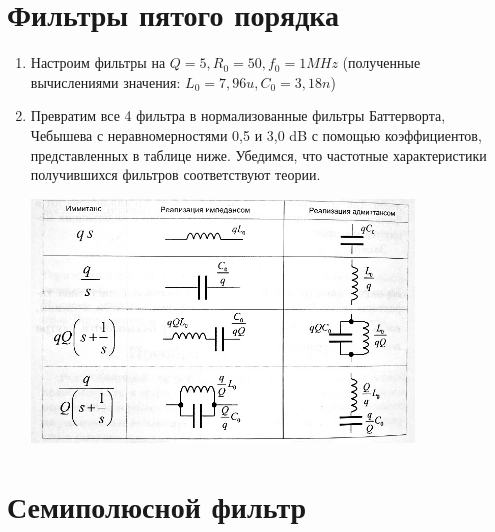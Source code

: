 \documentclass[a4paper, 12pt]{article}%
\begin{document}
\section{Фильтры пятого порядка}

\begin{enumerate}

\item Настроим фильтры на $Q = 5, R_0 = 50, f_0 = 1MHz$ (полученные вычислениями значения: $L_0= 7,96u, C_0 = 3,18n$)

\item Превратим все 4 фильтра в нормализованные фильтры Баттерворта, Чебышева с неравномерностями 0,5 и 3,0 dB с помощью коэффициентов, представленных в таблице ниже. Убедимся, что частотные характеристики получившихся фильтров соответствуют теории. 
    \begin{center}
    \includegraphics[width=0.8\textwidth]{hhh.png}
    \end{center}

\end{enumerate}

\section{Семиполюсной фильтр}
\end{document}
